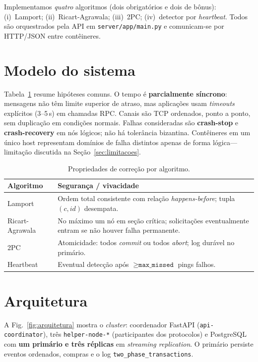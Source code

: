 \documentclass[conference]{IEEEtran}
\begin{document}
Implementamos \emph{quatro} algoritmos (dois obrigatórios e dois de
bônus): (i)~Lamport; (ii)~Ricart-Agrawala; (iii)~2PC; (iv)~detector por
\emph{heartbeat}. Todos são orquestrados pela API em
\texttt{server/app/main.py} e comunicam-se por HTTP/JSON entre contêineres.

\section{Modelo do sistema}

Tabela~\ref{tab:modelo} resume hipóteses comuns. O tempo é
\textbf{parcialmente síncrono}: mensagens não têm limite superior de
atraso, mas aplicações usam \emph{timeouts} explícitos (3--5\,s) em chamadas
RPC. Canais são TCP ordenados, ponto a ponto, sem duplicação em condições
normais. Falhas consideradas são \textbf{crash-stop} e
\textbf{crash-recovery} em nós lógicos; não há tolerância bizantina.
Contêineres em um único host representam domínios de falha distintos apenas
de forma lógica---limitação discutida na Seção~\ref{sec:limitacoes}.

\begin{table}[!t]
\centering
\caption{Propriedades de correção por algoritmo.}
\label{tab:modelo}
\scriptsize
\begin{tabular}{@{}p{}p{}@{}}
\toprule
Algoritmo & Segurança / vivacidade \\
\midrule
Lamport & Ordem total consistente com relação \emph{happens-before}; tupla $(c, id)$ desempata. \\
Ricart-Agrawala & No máximo um nó em seção crítica; solicitações eventualmente entram se não houver falha permanente. \\
2PC & Atomicidade: todos \emph{commit} ou todos \emph{abort}; log durável no primário. \\
Heartbeat & Eventual detecção após $\geq \texttt{max\_missed}$ pings falhos. \\
\bottomrule
\end{tabular}
\end{table}

\section{Arquitetura}

A Fig.~\ref{fig:arquitetura} mostra o \emph{cluster}: coordenador
FastAPI (\texttt{api-coordinator}), três \texttt{helper-node-*}
(participantes dos protocolos) e PostgreSQL com \textbf{um primário e três
réplicas} em \emph{streaming replication}. O primário persiste eventos
ordenados, compras e o log \texttt{two\_phase\_transactions}.
\end{document}
